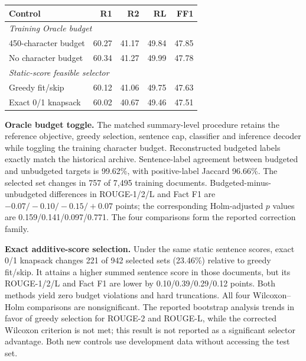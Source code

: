 \documentclass[10pt,twocolumn,letterpaper]{article}
\begin{document}
\par\medskip\noindent\begin{minipage}{\columnwidth}
\label{tab:matched}
\small
\begin{tabular*}{\columnwidth}{@{\extracolsep{\fill}}lrrrr@{}}
\toprule
\textbf{Control} & \textbf{R1} & \textbf{R2} & \textbf{RL} & \textbf{FF1} \\
\midrule
\multicolumn{5}{l}{\emph{Training Oracle budget}} \\
450-character budget & 60.27 & 41.17 & 49.84 & 47.85 \\
No character budget & 60.34 & 41.27 & 49.99 & 47.78 \\
\midrule
\multicolumn{5}{l}{\emph{Static-score feasible selector}} \\
Greedy fit/skip & 60.12 & 41.06 & 49.75 & 47.63 \\
Exact 0/1 knapsack & 60.02 & 40.67 & 49.46 & 47.51 \\
\bottomrule
\end{tabular*}
\end{minipage}\par\smallskip

\textbf{Oracle budget toggle.} The matched summary-level procedure retains the reference objective, greedy selection, sentence cap, classifier and inference decoder while toggling the training character budget. Reconstructed budgeted labels exactly match the historical archive. Sentence-label agreement between budgeted and unbudgeted targets is 99.62\%, with positive-label Jaccard 96.66\%. The selected set changes in 757 of 7,495 training documents. Budgeted-minus-unbudgeted differences in ROUGE-1/2/L and Fact F1 are $-0.07/-0.10/-0.15/+0.07$ points; the corresponding Holm-adjusted $p$ values are 0.159/0.141/0.097/0.771. The four comparisons form the reported correction family.

\textbf{Exact additive-score selection.} Under the same static sentence scores, exact 0/1 knapsack changes 221 of 942 selected sets (23.46\%) relative to greedy fit/skip. It attains a higher summed sentence score in those documents, but its ROUGE-1/2/L and Fact F1 are lower by 0.10/0.39/0.29/0.12 points. Both methods yield zero budget violations and hard truncations. All four Wilcoxon--Holm comparisons are nonsignificant. The reported bootstrap analysis trends in favor of greedy selection for ROUGE-2 and ROUGE-L, while the corrected Wilcoxon criterion is not met; this result is not reported as a significant selector advantage. Both new controls use development data without accessing the test set.
\end{document}
